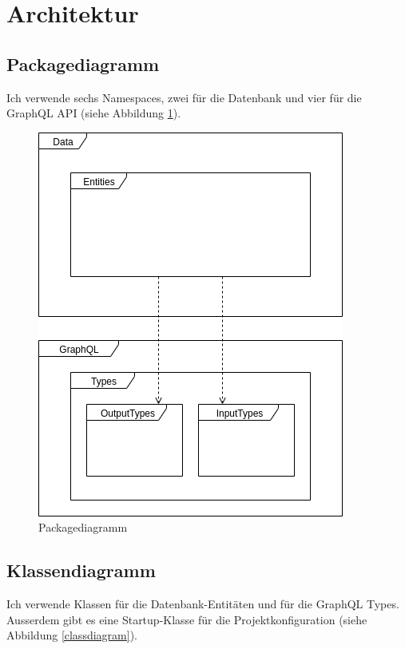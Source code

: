 \documentclass[a4paper, titlepage]{article}
\begin{document}
    \section{Architektur}
    \subsection{Packagediagramm}
    Ich verwende sechs Namespaces, zwei für die Datenbank und vier für die
    GraphQL API (siehe Abbildung \ref{packages}).

    \begin{figure}
        \includegraphics[width=\textwidth]{images/Packagediagramm.png}
        \caption{Packagediagramm}
        \label{packages}
    \end{figure}
    
    \subsection{Klassendiagramm}
    Ich verwende Klassen für die Datenbank-Entitäten und für die
    GraphQL Types. Ausserdem gibt es eine Startup-Klasse für die 
    Projektkonfiguration (siehe Abbildung \ref{classdiagram}).
\end{document}
